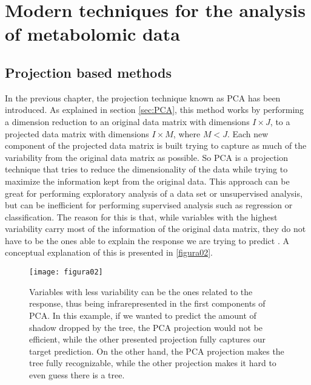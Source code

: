 
\chapter[Modern techniques for the analysis of metabolomic data]{Modern techniques for the analysis of metabolomic data}
\label{chapter:modern_techniques}


\section{Projection based methods}
\label{projectionmethods}
In the previous chapter, the projection technique known as PCA has been introduced. As explained in section \ref{sec:PCA}, this method works by performing a dimension reduction to an original data matrix with dimensions $I \times J$, to a projected data matrix with dimensions $I \times M$, where $M<J$. Each new component of the projected data matrix is built trying to capture as much of the variability from the original data matrix as possible. So PCA is a projection technique that tries to reduce the dimensionality of the data while trying to maximize the information kept from the original data. This approach can be great for performing exploratory analysis of a data set or unsupervised analysis, but can be inefficient for performing supervised analysis such as regression or classification. The reason for this is that, while variables with the highest variability carry most of the information of the original data matrix, they do not have to be the ones able to explain the response we are trying to predict \parencite{kettaneh2005pca}. A conceptual explanation of this is presented in \autoref{figura02}.

\begin{figure}[htbp]\centering
		\texttt{[image: figura02]}
		\caption{Variables with less variability can be the ones related to the response, thus being infrarepresented in the first components of PCA. In this example, if we wanted to predict the amount of shadow dropped by the tree, the PCA projection would not be efficient, while the other presented projection fully captures our target prediction. On the other hand, the PCA projection makes the tree fully recognizable, while the other projection makes it hard to even guess there is a tree.}
		\label{figura02}
	\end{figure}

